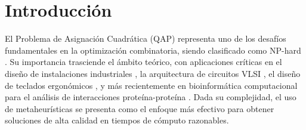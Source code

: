 \documentclass[12pt, a4paper]{article}
\begin{document}

\newpage
\tableofcontents
\newpage

\section{Introducción}

El Problema de Asignación Cuadrática (QAP) representa uno de los desafíos fundamentales en la optimización combinatoria, siendo clasificado como NP-hard \cite{sahni1976}. Su importancia trasciende el ámbito teórico, con aplicaciones críticas en el diseño de instalaciones industriales \cite{koopmans1957}, la arquitectura de circuitos VLSI \cite{steinberg1961}, el diseño de teclados ergonómicos \cite{burkard1997}, y más recientemente en bioinformática computacional para el análisis de interacciones proteína-proteína \cite{anstreicher2003}. Dada su complejidad, el uso de metaheurísticas se presenta como el enfoque más efectivo para obtener soluciones de alta calidad en tiempos de cómputo razonables.
\end{document}
